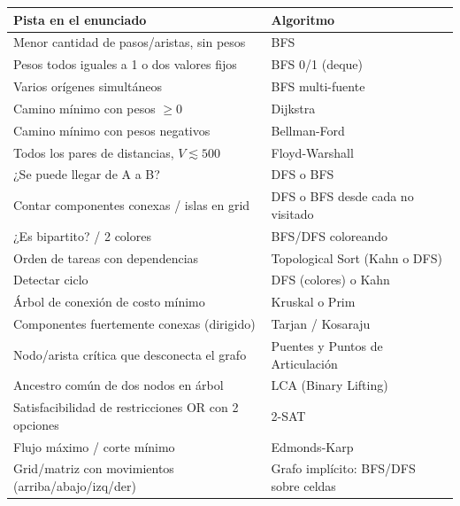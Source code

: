 \documentclass[10pt,twocolumn,letterpaper]{report}
\begin{document}
\begin{center}
\scriptsize
\begin{tabular}{|p{3.1cm}|p{3.3cm}|}
\hline
\textbf{Pista en el enunciado} & \textbf{Algoritmo} \\
\hline
Menor cantidad de pasos/aristas, sin pesos & BFS \\
\hline
Pesos todos iguales a 1 o dos valores fijos & BFS 0/1 (deque) \\
\hline
Varios orígenes simultáneos & BFS multi-fuente \\
\hline
Camino mínimo con pesos $\geq 0$ & Dijkstra \\
\hline
Camino mínimo con pesos negativos & Bellman-Ford \\
\hline
Todos los pares de distancias, $V \lesssim 500$ & Floyd-Warshall \\
\hline
¿Se puede llegar de A a B? & DFS o BFS \\
\hline
Contar componentes conexas / islas en grid & DFS o BFS desde cada no visitado \\
\hline
¿Es bipartito? / 2 colores & BFS/DFS coloreando \\
\hline
Orden de tareas con dependencias & Topological Sort (Kahn o DFS) \\
\hline
Detectar ciclo & DFS (colores) o Kahn \\
\hline
Árbol de conexión de costo mínimo & Kruskal o Prim \\
\hline
Componentes fuertemente conexas (dirigido) & Tarjan / Kosaraju \\
\hline
Nodo/arista crítica que desconecta el grafo & Puentes y Puntos de Articulación \\
\hline
Ancestro común de dos nodos en árbol & LCA (Binary Lifting) \\
\hline
Satisfacibilidad de restricciones OR con 2 opciones & 2-SAT \\
\hline
Flujo máximo / corte mínimo & Edmonds-Karp \\
\hline
Grid/matriz con movimientos (arriba/abajo/izq/der) & Grafo implícito: BFS/DFS sobre celdas \\
\hline
\end{tabular}
\end{center}

\end{document}
